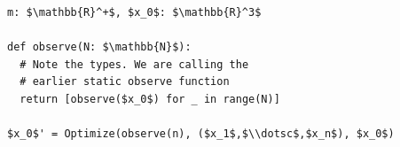 \documentclass[border=10pt]{standalone}
\begin{document}
\begin{lstlisting}
m: $\mathbb{R}^+$, $x_0$: $\mathbb{R}^3$

def observe(N: $\mathbb{N}$):
  # Note the types. We are calling the
  # earlier static observe function
  return [observe($x_0$) for _ in range(N)]
  
$x_0$' = Optimize(observe(n), ($x_1$,$\\dotsc$,$x_n$), $x_0$)
\end{lstlisting}
\end{document}
